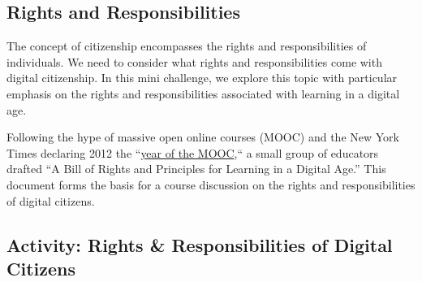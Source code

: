 \documentclass[
]{book}
\theoremstyle{definition}
\theoremstyle{definition}
\theoremstyle{definition}
\theoremstyle{definition}
\theoremstyle{remark}
\begin{document}
\hypertarget{rights-and-responsibilities}{%
\subsection*{Rights and Responsibilities}\label{rights-and-responsibilities}}

The concept of citizenship encompasses the rights and responsibilities of individuals. We need to consider what rights and responsibilities come with digital citizenship. In this mini challenge, we explore this topic with particular emphasis on the rights and responsibilities associated with learning in a digital age.

Following the hype of massive open online courses (MOOC) and the New York Times declaring 2012 the ``\href{https://www.nytimes.com/2012/11/04/education/edlife/massive-open-online-courses-are-multiplying-at-a-rapid-pace.html}{year of the MOOC},`` a small group of educators drafted ``A Bill of Rights and Principles for Learning in a Digital Age.'' This document forms the basis for a course discussion on the rights and responsibilities of digital citizens.

\hypertarget{activity-rights-responsibilities-of-digital-citizens}{%
\subsection*{Activity: Rights \& Responsibilities of Digital Citizens}\label{activity-rights-responsibilities-of-digital-citizens}}
\end{document}
